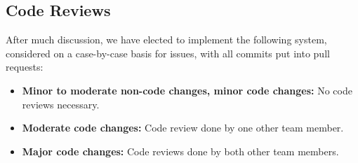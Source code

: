 \subsection{Code Reviews}

After much discussion, we have elected to implement the following system, considered on a case-by-case basis for issues, with all commits put into pull requests:

\medskip

\begin{itemize}[nosep]
    \item \textbf{Minor to moderate non-code changes, minor code changes:} No code reviews necessary.
    \item \textbf{Moderate code changes:} Code review done by one other team member.
    \item \textbf{Major code changes:} Code reviews done by both other team members.
\end{itemize}